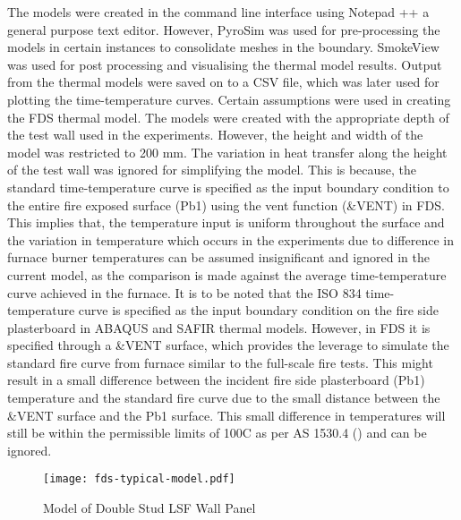 The models were created in the command line interface using Notepad ++ a general purpose text editor. However, PyroSim was used for pre-processing the models in certain instances to consolidate meshes in the boundary. SmokeView was used for post processing and visualising the thermal model results. Output from the thermal models were saved on to a CSV file, which was later used for plotting the time-temperature curves. Certain assumptions were used in creating the FDS thermal model. The models were created with the appropriate depth of the test wall used in the experiments. However, the height and width of the model was restricted to 200 mm. The variation in heat transfer along the height of the test wall was ignored for simplifying the model. This is because, the standard time-temperature curve is specified as the input boundary condition to the entire fire exposed surface (Pb1) using the vent function (\&VENT) in FDS. This implies that, the temperature input is uniform throughout the surface and the variation in temperature which occurs in the experiments due to difference in furnace burner temperatures can be assumed insignificant and ignored in the current model, as the comparison is made against the average time-temperature curve achieved in the furnace. It is to be noted that the ISO 834 time-temperature curve is specified as the input boundary condition on the fire side plasterboard in ABAQUS and SAFIR thermal models. However, in FDS it is specified through a \&VENT surface, which provides the leverage to simulate the standard fire curve from furnace similar to the full-scale fire tests. This might result in a small difference between the incident fire side plasterboard (Pb1) temperature and the standard fire curve due to the small distance between the \&VENT surface and the Pb1 surface. This small difference in temperatures will still be within the permissible limits of 100\degree C as per AS 1530.4 (\citet{StandardsAustral2014}) and can be ignored.
\begin{figure}[!htbp]
	\centering
		\texttt{[image: fds-typical-model.pdf]}
		\caption{Model of Double Stud LSF Wall Panel}
		\label{fig:fds-typical-model}
\end{figure}

